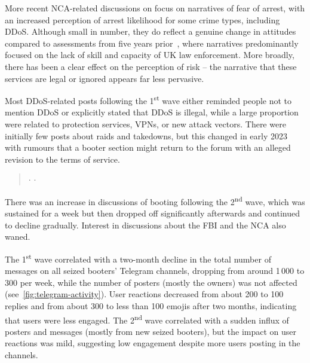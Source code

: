 \documentclass[letterpaper,twocolumn,10pt]{article}
\begin{document}
\noindent More recent NCA-related discussions on \hackforums focus on narratives of fear of arrest, with an increased perception of arrest likelihood for some crime types, including DDoS. Although small in number, they do reflect a genuine change in attitudes compared to assessments from five years prior~\cite{collier2019booting}, where narratives predominantly focused on the lack of skill and capacity of UK law enforcement. More broadly, there has been a clear effect on the perception of risk -- the narrative that these services are legal or ignored appears far less pervasive.

Most DDoS-related posts following the 1\textsuperscript{st} wave either reminded people not to mention DDoS or explicitly stated that DDoS is illegal, while a large proportion were related to protection services, VPNs, or new attack vectors. There were initially few posts about raids and takedowns, but this changed in early 2023 with rumours that a booter section might return to the forum with an alleged revision to the terms of service. 

\begingroup
\addtolength\leftmargini{-0.15in}
\begin{quote}
     $\cdot$ 
     $\cdot$ 
\end{quote}
\endgroup

\noindent There was an increase in discussions of booting following the 2\textsuperscript{nd} wave, which was sustained for a week but then dropped off significantly afterwards and continued to decline gradually. Interest in discussions about the FBI and the NCA also waned.

 The 1\textsuperscript{st} wave correlated with a two-month decline in the total number of messages on all seized booters' Telegram channels, dropping from around 1\,000 to 300 per week, while the number of posters (mostly the owners) was not affected (see~\autoref{fig:telegram-activity}). User reactions decreased from about 200 to 100 replies and from about 300 to less than 100 emojis after two months, indicating that users were less engaged. The 2\textsuperscript{nd} wave correlated with a sudden influx of posters and messages (mostly from new seized booters), but the impact on user reactions was mild, suggesting low engagement despite more users posting in the channels.
\end{document}

